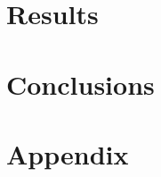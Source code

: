 \documentclass[a4paper,fleqn]{cas-dc}
\begin{document}
%


\section{Results} \label{CH: Results}

\section{Conclusions}

\clearpage
%



\clearpage \appendix \label{appendix}
\section{Appendix} 
\end{document}
